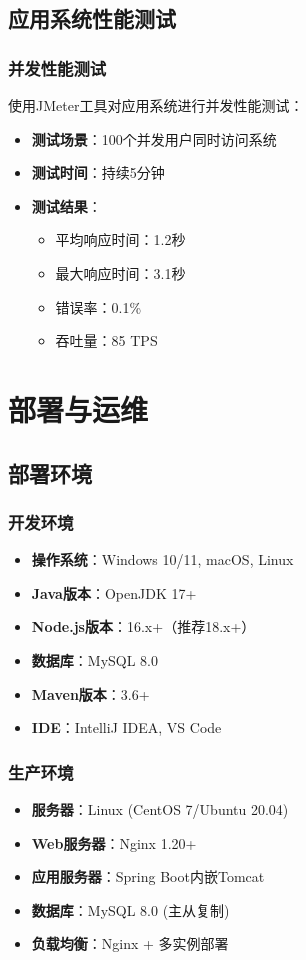 \documentclass[12pt,a4paper]{article}
\begin{document}
\subsection{应用系统性能测试}

\subsubsection{并发性能测试}
使用JMeter工具对应用系统进行并发性能测试：

\begin{itemize}
    \item \textbf{测试场景}：100个并发用户同时访问系统
    \item \textbf{测试时间}：持续5分钟
    \item \textbf{测试结果}：
    \begin{itemize}
        \item 平均响应时间：1.2秒
        \item 最大响应时间：3.1秒
        \item 错误率：0.1\%
        \item 吞吐量：85 TPS
    \end{itemize}
\end{itemize}

\section{部署与运维}

\subsection{部署环境}

\subsubsection{开发环境}
\begin{itemize}
    \item \textbf{操作系统}：Windows 10/11, macOS, Linux
    \item \textbf{Java版本}：OpenJDK 17+
    \item \textbf{Node.js版本}：16.x+（推荐18.x+）
    \item \textbf{数据库}：MySQL 8.0
    \item \textbf{Maven版本}：3.6+
    \item \textbf{IDE}：IntelliJ IDEA, VS Code
\end{itemize}

\subsubsection{生产环境}
\begin{itemize}
    \item \textbf{服务器}：Linux (CentOS 7/Ubuntu 20.04)
    \item \textbf{Web服务器}：Nginx 1.20+
    \item \textbf{应用服务器}：Spring Boot内嵌Tomcat
    \item \textbf{数据库}：MySQL 8.0 (主从复制)
    \item \textbf{负载均衡}：Nginx + 多实例部署
\end{itemize}
\end{document}
